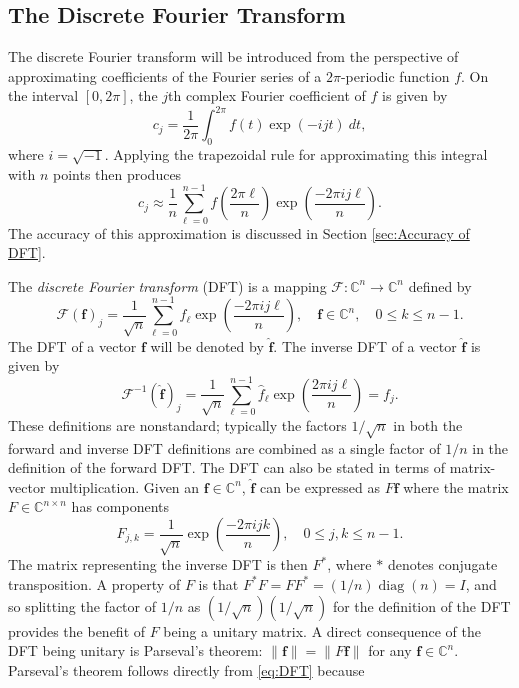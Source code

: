 \documentclass[12pt]{article}
\newcommand{\ctrans}{*}	%
\newcommand{\diag}{\operatorname{diag}}	%
\begin{document}
\subsection{The Discrete Fourier Transform} \label{sec:The Discrete Fourier Transform}
The discrete Fourier transform will be introduced from the perspective of approximating coefficients of the Fourier series of a $2\pi$-periodic function $f$. On the interval $[0,2\pi]$, the $j$th complex Fourier coefficient of $f$ is given by
\[c_j = \frac{1}{2\pi}\int_0^{2\pi} f(t)\exp(-ijt)\:dt,\]
where $i = \sqrt{-1}$.  Applying the trapezoidal rule for approximating this integral with $n$ points then produces
\[c_j \approx \frac{1}{n}\sum_{\ell = 0}^{n-1} f\left(\frac{2\pi{\ell}}{n}\right)\exp\left(\frac{-2\pi{ij\ell}}{n}\right).\]
The accuracy of this approximation is discussed in Section \ref{sec:Accuracy of DFT}. \par 
The \textit{discrete Fourier transform} (DFT) is a mapping $\mathcal{F}:\mathbb{C}^n \rightarrow \mathbb{C}^n$ defined by
\begin{equation}
\mathcal{F}(\mathbf{f})_j = \frac{1}{\sqrt{n}}\sum_{\ell=0}^{n-1} f_{\ell}\exp\left(\frac{-2\pi{ij\ell}}{n}\right), \quad \mathbf{f}\in\mathbb{C}^n, \quad 0 \leq k \leq n-1.
\label{eq:DFT}
\end{equation}
The DFT of a vector $\mathbf{f}$ will be denoted by $\widehat{\mathbf{f}}$. The inverse DFT of a vector $\widehat{\mathbf{f}}$ is given by
\begin{equation}
\mathcal{F}^{-1}(\widehat{\mathbf{f}})_j = \frac{1}{\sqrt{n}}\sum_{\ell=0}^{n-1} \widehat{f}_\ell\exp\left(\frac{2\pi{ij\ell}}{n}\right) = f_j.
\end{equation}
These definitions are nonstandard; typically the factors $1/\sqrt{n}$ in both the forward and inverse DFT definitions are combined as a single factor of $1/n$ in the definition of the forward DFT. The DFT can also be stated in terms of matrix-vector multiplication. Given an $\mathbf{f} \in \mathbb{C}^n$, $\widehat{\mathbf{f}}$ can be expressed as $F\mathbf{f}$ where the matrix $F\in\mathbb{C}^{n\times{n}}$ has components
\begin{equation}
F_{j,k} = \frac{1}{\sqrt{n}}\exp\left(\frac{-2\pi{ijk}}{n}\right), \quad 0 \leq j,k \leq n-1.
\label{eq:DFT-Matrix}
\end{equation}
The matrix representing the inverse DFT is then $F^\ctrans$, where $\ctrans$ denotes conjugate transposition. A property of $F$ is that $F^\ctrans F = FF^\ctrans = (1/n)\diag(n) = I$, and so splitting the factor of $1/n$ as $(1/\sqrt{n})(1/\sqrt{n})$ for the definition of the DFT provides the benefit of $F$ being a unitary matrix. A direct consequence of the DFT being unitary is Parseval's theorem: $\|\mathbf{f}\| = \|F\mathbf{f}\|$ for any $\mathbf{f} \in \mathbb{C}^n$. Parseval's theorem follows directly from \eqref{eq:DFT} because
\end{document}
